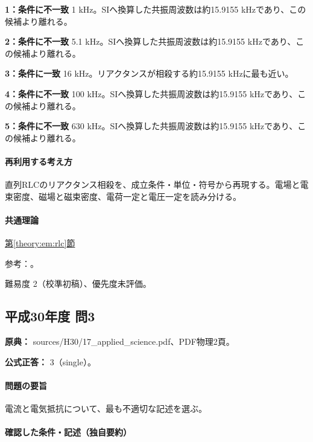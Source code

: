 \noindent\textbf{1：条件に不一致} 1 kHz。SIへ換算した共振周波数は約15.9155 kHzであり、この候補より離れる。\par

\noindent\textbf{2：条件に不一致} 5.1 kHz。SIへ換算した共振周波数は約15.9155 kHzであり、この候補より離れる。\par

\noindent\textbf{3：条件に一致} 16 kHz。リアクタンスが相殺する約15.9155 kHzに最も近い。\par

\noindent\textbf{4：条件に不一致} 100 kHz。SIへ換算した共振周波数は約15.9155 kHzであり、この候補より離れる。\par

\noindent\textbf{5：条件に不一致} 630 kHz。SIへ換算した共振周波数は約15.9155 kHzであり、この候補より離れる。\par

\paragraph{再利用する考え方} 直列RLCのリアクタンス相殺を、成立条件・単位・符号から再現する。電場と電束密度、磁場と磁束密度、電荷一定と電圧一定を読み分ける。

\paragraph{共通理論} \hyperref[theory:em:rlc]{第\ref*{theory:em:rlc}節}

\par 参考：\cite{mit_em12}。

\par 難易度 2（校準初稿）、優先度未評価。

\subsection{平成30年度 問3}
\label{q:h30-reg-applied-03}

\noindent\textbf{原典：} sources/H30/17\_applied\_science.pdf、PDF物理2頁。

\textbf{公式正答：} 3（single）。

\paragraph{問題の要旨} 電流と電気抵抗について、最も不適切な記述を選ぶ。

\paragraph{確認した条件・記述（独自要約）}\mbox{}\par

